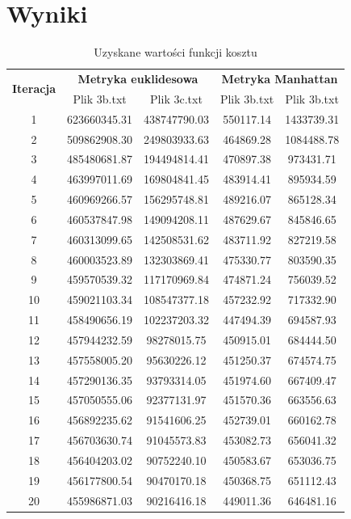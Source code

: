 \documentclass{classrep}
\begin{document}
\section{Wyniki}

\begin{table}[H]
\centering
\caption{Uzyskane wartości funkcji kosztu}
\label{tab:res1}
\begin{tabular}{|c|c|c|c|c|}
\hline
\multirow{2}{*}{\textbf{Iteracja}} & \multicolumn{2}{c|}{\textbf{Metryka euklidesowa}} & \multicolumn{2}{c|}{\textbf{Metryka Manhattan}} \\ \cline{2-5} 
 & Plik 3b.txt & Plik 3c.txt & Plik 3b.txt & Plik 3b.txt \\ \hline
1 & 623660345.31 & 438747790.03 & 550117.14 & 1433739.31 \\ \hline
2 & 509862908.30 & 249803933.63 & 464869.28 & 1084488.78 \\ \hline
3 & 485480681.87 & 194494814.41 & 470897.38 & 973431.71 \\ \hline
4 & 463997011.69 & 169804841.45 & 483914.41 & 895934.59 \\ \hline
5 & 460969266.57 & 156295748.81 & 489216.07 & 865128.34 \\ \hline
6 & 460537847.98 & 149094208.11 & 487629.67 & 845846.65 \\ \hline
7 & 460313099.65 & 142508531.62 & 483711.92 & 827219.58 \\ \hline
8 & 460003523.89 & 132303869.41 & 475330.77 & 803590.35 \\ \hline
9 & 459570539.32 & 117170969.84 & 474871.24 & 756039.52 \\ \hline
10 & 459021103.34 & 108547377.18 & 457232.92 & 717332.90 \\ \hline
11 & 458490656.19 & 102237203.32 & 447494.39 & 694587.93 \\ \hline
12 & 457944232.59 & 98278015.75 & 450915.01 & 684444.50 \\ \hline
13 & 457558005.20 & 95630226.12 & 451250.37 & 674574.75 \\ \hline
14 & 457290136.35 & 93793314.05 & 451974.60 & 667409.47 \\ \hline
15 & 457050555.06 & 92377131.97 & 451570.36 & 663556.63 \\ \hline
16 & 456892235.62 & 91541606.25 & 452739.01 & 660162.78 \\ \hline
17 & 456703630.74 & 91045573.83 & 453082.73 & 656041.32 \\ \hline
18 & 456404203.02 & 90752240.10 & 450583.67 & 653036.75 \\ \hline
19 & 456177800.54 & 90470170.18 & 450368.75 & 651112.43 \\ \hline
20 & 455986871.03 & 90216416.18 & 449011.36 & 646481.16 \\ \hline
\end{tabular}
\end{table}
\end{document}
